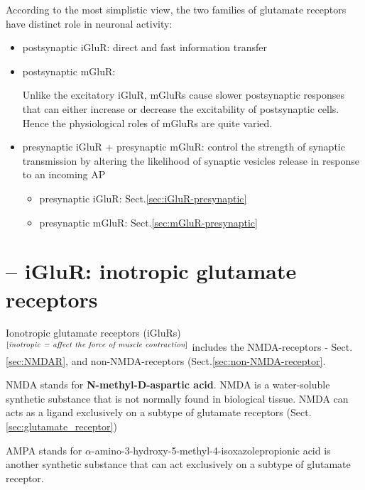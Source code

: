 According to the most simplistic view, the two families of glutamate receptors
have distinct role in neuronal activity:
\begin{itemize}
  \item postsynaptic iGluR: direct and fast information transfer
  
  
  \item postsynaptic mGluR: 

Unlike the excitatory iGluR, mGluRs cause slower
postsynaptic responses that can either increase or decrease the excitability of
postsynaptic cells. Hence the physiological roles of mGluRs are quite varied.


  \item presynaptic iGluR + presynaptic mGluR: control the strength of synaptic
  transmission by altering the likelihood of synaptic vesicles release in
  response to an incoming AP
  
  \begin{itemize}
    \item presynaptic iGluR:  Sect.\ref{sec:iGluR-presynaptic}
    
    \item presynaptic mGluR:  Sect.\ref{sec:mGluR-presynaptic}
  \end{itemize}
\end{itemize}


\section{-- iGluR: inotropic glutamate receptors}
\label{sec:inotropic-glutamate-receptors}
\label{sec:iGluR}

Ionotropic glutamate receptors (iGluRs) 
$^\text{[{\it inotropic = affect the force of muscle contraction}]}$ includes
the NMDA-receptors - Sect.\ref{sec:NMDAR}, and non-NMDA-receptors
(Sect.\ref{sec:non-NMDA-receptor}.


\label{sec:NMDA}
\label{sec:AMPA}
\begin{mdframed}

NMDA stands for {\bf N-methyl-D-aspartic acid}. 
NMDA is a water-soluble synthetic substance that is not normally found in
biological tissue. NMDA can acts as a ligand exclusively on a subtype of
glutamate receptors (Sect.\ref{sec:glutamate_receptor}) 


AMPA stands for $\alpha$-amino-3-hydroxy-5-methyl-4-isoxazolepropionic
acid is another synthetic substance that can act exclusively on a subtype of
glutamate receptor.
\end{mdframed}

